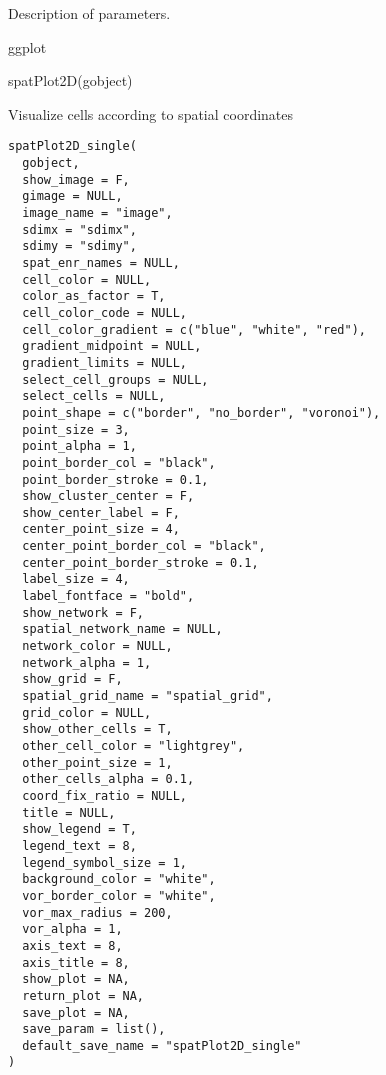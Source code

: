 \documentclass[a4paper]{book}
\begin{document}
%
\begin{Details}\relax
Description of parameters.
\end{Details}
%
\begin{Value}
ggplot
\end{Value}
%
\begin{SeeAlso}\relax
{}
\end{SeeAlso}
%
\begin{Examples}
\begin{ExampleCode}
    spatPlot2D(gobject)
\end{ExampleCode}
\end{Examples}
%
\begin{Description}\relax
Visualize cells according to spatial coordinates
\end{Description}
%
\begin{Usage}
\begin{verbatim}
spatPlot2D_single(
  gobject,
  show_image = F,
  gimage = NULL,
  image_name = "image",
  sdimx = "sdimx",
  sdimy = "sdimy",
  spat_enr_names = NULL,
  cell_color = NULL,
  color_as_factor = T,
  cell_color_code = NULL,
  cell_color_gradient = c("blue", "white", "red"),
  gradient_midpoint = NULL,
  gradient_limits = NULL,
  select_cell_groups = NULL,
  select_cells = NULL,
  point_shape = c("border", "no_border", "voronoi"),
  point_size = 3,
  point_alpha = 1,
  point_border_col = "black",
  point_border_stroke = 0.1,
  show_cluster_center = F,
  show_center_label = F,
  center_point_size = 4,
  center_point_border_col = "black",
  center_point_border_stroke = 0.1,
  label_size = 4,
  label_fontface = "bold",
  show_network = F,
  spatial_network_name = NULL,
  network_color = NULL,
  network_alpha = 1,
  show_grid = F,
  spatial_grid_name = "spatial_grid",
  grid_color = NULL,
  show_other_cells = T,
  other_cell_color = "lightgrey",
  other_point_size = 1,
  other_cells_alpha = 0.1,
  coord_fix_ratio = NULL,
  title = NULL,
  show_legend = T,
  legend_text = 8,
  legend_symbol_size = 1,
  background_color = "white",
  vor_border_color = "white",
  vor_max_radius = 200,
  vor_alpha = 1,
  axis_text = 8,
  axis_title = 8,
  show_plot = NA,
  return_plot = NA,
  save_plot = NA,
  save_param = list(),
  default_save_name = "spatPlot2D_single"
)
\end{verbatim}
\end{Usage}
%
\end{document}

